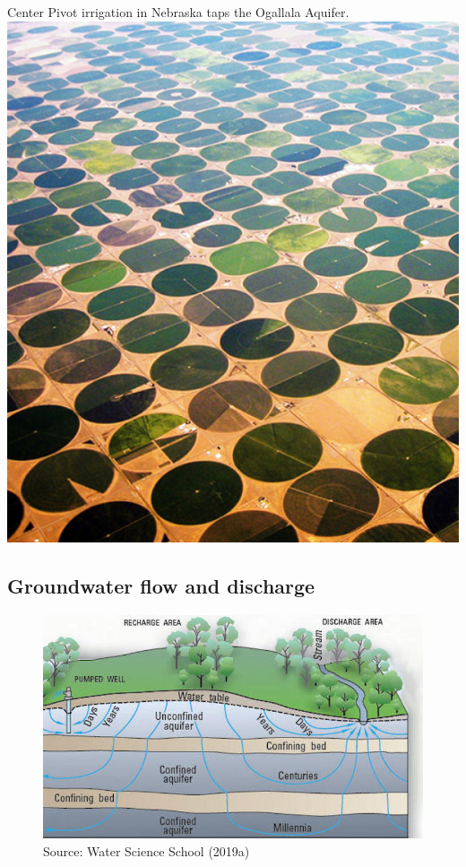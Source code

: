 \documentclass[
  letterpaper,
  DIV=11,
  numbers=noendperiod]{scrreprt}
\begin{document}
Center Pivot irrigation in Nebraska taps the Ogallala Aquifer.
\includegraphics{archive/figures/groundwater-ogallala-aquifer.jpg}

\hypertarget{groundwater-flow-and-discharge}{%
\subsection{Groundwater flow and
discharge}\label{groundwater-flow-and-discharge}}

\begin{figure}

{\centering \includegraphics{archive/figures/groundwater-flow-diagram.jpg}

}

\caption{Source: Water Science School (2019a)}

\end{figure}
\end{document}

